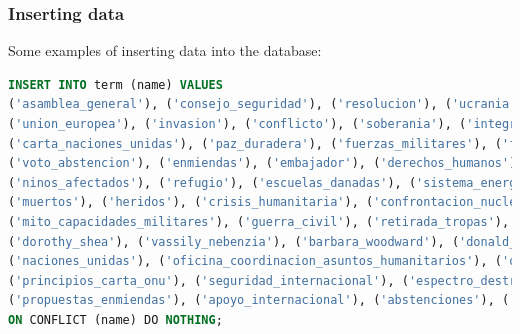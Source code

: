 \documentclass[twoside]{article}
\begin{document}
\subsubsection{Inserting data}

Some examples of inserting data into the database:

\begin{lstlisting}[language=SQL,caption={Inserting Terms},label={lst:insertterms}]
INSERT INTO term (name) VALUES
('asamblea_general'), ('consejo_seguridad'), ('resolucion'), ('ucrania'), ('rusia'), ('estados_unidos'),
('union_europea'), ('invasion'), ('conflicto'), ('soberania'), ('integridad_territorial'), ('hostilidades'),
('carta_naciones_unidas'), ('paz_duradera'), ('fuerzas_militares'), ('fronteras_internacionalmente_reconocidas'),
('voto_abstencion'), ('enmiendas'), ('embajador'), ('derechos_humanos'), ('ayuda_humanitaria'), ('victimas_civiles'),
('ninos_afectados'), ('refugio'), ('escuelas_danadas'), ('sistema_energetico'), ('calefaccion'), ('electricidad'),
('muertos'), ('heridos'), ('crisis_humanitaria'), ('confrontacion_nuclear'), ('orden_internacional'), ('solidaridad'),
('mito_capacidades_militares'), ('guerra_civil'), ('retirada_tropas'), ('camino_paz'), ('vetos'), ('mariana_betsa'),
('dorothy_shea'), ('vassily_nebenzia'), ('barbara_woodward'), ('donald_trump'), ('kiev'), ('moscu'), ('onu'),
('naciones_unidas'), ('oficina_coordinacion_asuntos_humanitarios'), ('ocha'), ('resolucion_pacifica_disputas'),
('principios_carta_onu'), ('seguridad_internacional'), ('espectro_destruccion_total'), ('causa_profunda_conflicto'),
('propuestas_enmiendas'), ('apoyo_internacional'), ('abstenciones'), ('votos_favor'), ('votos_contra')
ON CONFLICT (name) DO NOTHING;
\end{lstlisting}
\end{document}
